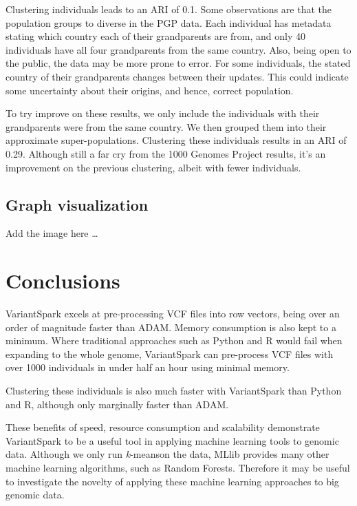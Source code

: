 \documentclass{bmcart}
\newcommand{\variantSpark}{{\sc VariantSpark}}
\newcommand{\kMeans}{\textit{k}-means}
\begin{document}
Clustering individuals leads to an ARI of 0.1. 
Some observations are that the population groups to diverse in the PGP data. Each individual has metadata stating which country each of their grandparents are from, and only 40 individuals have all four grandparents from the same country.
Also, being open to the public, the data may be more prone to error. For some individuals, the stated country of their grandparents changes between their updates. This could indicate some uncertainty about their origins, and hence, correct population.

To try improve on these results, we only include the individuals with their grandparents were from the same country.
We then grouped them into their approximate super-populations. Clustering these individuals results in an ARI of 0.29. Although still a far cry from the 1000 Genomes Project results, it's an improvement on the previous clustering, albeit with fewer individuals.



\subsection*{Graph visualization}
Add the image here \ldots



\section*{Conclusions}
\variantSpark{} excels at pre-processing VCF files into row vectors, being over an order of magnitude faster than ADAM. Memory consumption is also kept to a minimum. Where traditional approaches such as Python and R would fail when expanding to the whole genome,
\variantSpark{} can pre-process VCF files with over 1000 individuals in under half an hour using minimal memory.

Clustering these individuals is also much faster with \variantSpark{} than Python and R, although only marginally faster than ADAM.

These benefits of speed, resource consumption and scalability demonstrate \variantSpark{} to be a useful tool in applying machine learning tools to genomic data. Although we only run \kMeans on the data, MLlib provides many other machine learning algorithms, such as Random Forests.
Therefore it may be useful to investigate the novelty of applying these machine learning approaches to big genomic data.  


\end{document}
